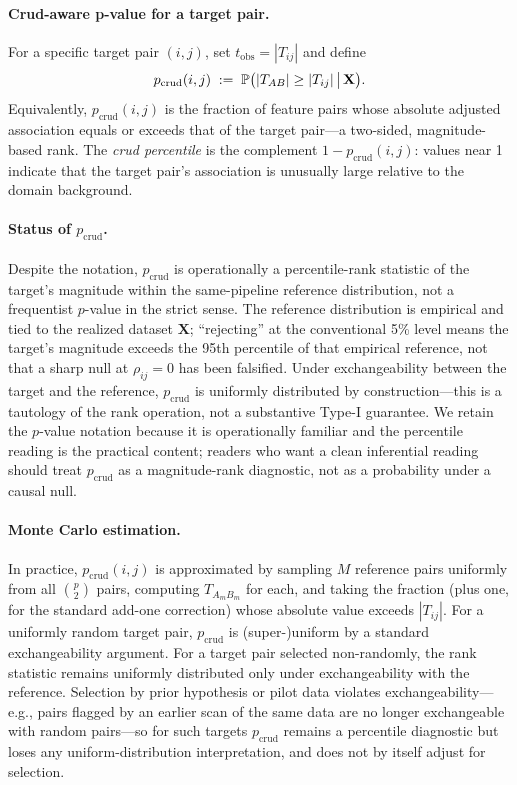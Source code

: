 \paragraph{Crud-aware p-value for a target pair.}
For a specific target pair $(i,j)$, set $t_{\mathrm{obs}}=|T_{ij}|$ and define
\begin{equation}
p_{\mathrm{crud}}(i,j)\;:=\;\mathbb{P}\bigl(|T_{AB}|\ge |T_{ij}| \,\big|\, \mathbf{X}\bigr).
\end{equation}
Equivalently, $p_{\mathrm{crud}}(i,j)$ is the fraction of feature pairs whose absolute adjusted association equals or exceeds that of the target pair---a two-sided, magnitude-based rank.
The \emph{crud percentile} is the complement $1-p_{\mathrm{crud}}(i,j)$: values near 1 indicate that the target pair's association is unusually large relative to the domain background.

\paragraph{Status of $p_{\mathrm{crud}}$.}
Despite the notation, $p_{\mathrm{crud}}$ is operationally a percentile-rank statistic of the target's magnitude within the same-pipeline reference distribution, not a frequentist $p$-value in the strict sense. The reference distribution is empirical and tied to the realized dataset $\mathbf{X}$; ``rejecting'' at the conventional 5\% level means the target's magnitude exceeds the 95th percentile of that empirical reference, not that a sharp null at $\rho_{ij}=0$ has been falsified. Under exchangeability between the target and the reference, $p_{\mathrm{crud}}$ is uniformly distributed by construction---this is a tautology of the rank operation, not a substantive Type-I guarantee. We retain the $p$-value notation because it is operationally familiar and the percentile reading is the practical content; readers who want a clean inferential reading should treat $p_{\mathrm{crud}}$ as a magnitude-rank diagnostic, not as a probability under a causal null.

\paragraph{Monte Carlo estimation.}
In practice, $p_{\mathrm{crud}}(i,j)$ is approximated by sampling $M$ reference pairs uniformly from all $\binom{p}{2}$ pairs, computing $T_{A_mB_m}$ for each, and taking the fraction (plus one, for the standard add-one correction) whose absolute value exceeds $|T_{ij}|$. For a uniformly random target pair, $p_{\mathrm{crud}}$ is (super-)uniform by a standard exchangeability argument. For a target pair selected non-randomly, the rank statistic remains uniformly distributed only under exchangeability with the reference. Selection by prior hypothesis or pilot data violates exchangeability---e.g., pairs flagged by an earlier scan of the same data are no longer exchangeable with random pairs---so for such targets $p_{\mathrm{crud}}$ remains a percentile diagnostic but loses any uniform-distribution interpretation, and does not by itself adjust for selection.

